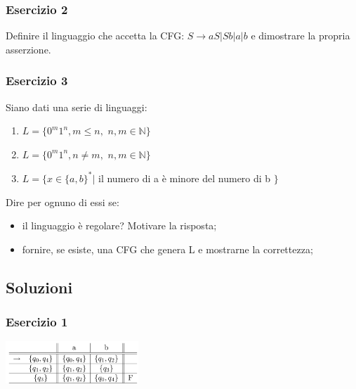 \documentclass[a4paper,11pt]{article}
\begin{document}
\subsubsection{Esercizio 2}
Definire il linguaggio che accetta la CFG: $S\rightarrow aS|Sb|a|b$ e dimostrare la propria asserzione.
   \subsubsection{Esercizio 3}
    Siano dati una serie di linguaggi:
    \begin{enumerate}
        \item $L=\{0^m1^n,m\leq n,$ $n,m\in \mathbb{N}\}$
        \item $L=\{0^m1^n,n\neq m,$ $n,m\in \mathbb{N}\}$
        \item $L=\{x\in\{a,b\}^{*}|$ il numero di a è minore del numero di b $\}$
    \end{enumerate}
    Dire per ognuno di essi se:
    \begin{itemize}
        \item il linguaggio è regolare? Motivare la risposta;
        \item fornire, se esiste, una CFG che genera L e mostrarne la correttezza;
    \end{itemize}

    \subsection{Soluzioni}
    \subsubsection{Esercizio 1}
    \begin{minipage}{\linewidth}
        \centering
        \includegraphics[width=5cm]{Lez4minsol.png}
    \end{minipage}
\end{document}
